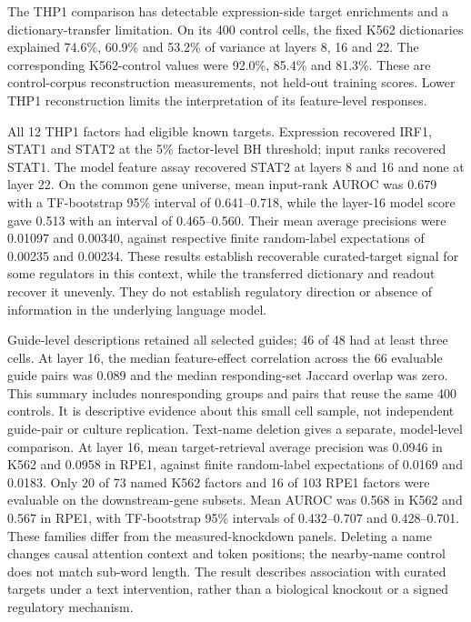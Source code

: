 \documentclass[review,authoryear,12pt]{elsarticle}
\begin{document}
The THP1 comparison has detectable expression-side target enrichments and a dictionary-transfer
limitation. On its 400 control cells, the fixed K562 dictionaries
explained 74.6\%, 60.9\% and 53.2\% of variance at layers 8, 16 and 22. The corresponding
K562-control values were 92.0\%, 85.4\% and 81.3\%. These are control-corpus reconstruction
measurements, not held-out training scores. Lower THP1 reconstruction limits the interpretation
of its feature-level responses.

All 12 THP1 factors had eligible known targets. Expression recovered IRF1, STAT1 and STAT2 at
the 5\% factor-level BH threshold; input ranks recovered STAT1. The model feature assay recovered STAT2
at layers 8 and 16 and none at layer 22. On the common gene universe, mean input-rank AUROC was
0.679 with a TF-bootstrap 95\% interval of 0.641--0.718, while the layer-16 model score gave
0.513 with an interval of 0.465--0.560. Their mean average precisions were 0.01097 and 0.00340,
against respective finite random-label expectations of 0.00235 and 0.00234. These results establish
recoverable curated-target signal for some regulators in this context, while the transferred
dictionary and readout recover it unevenly. They do not establish regulatory direction or absence
of information in the underlying language model.

Guide-level descriptions retained all selected guides; 46 of 48 had at least three cells.
At layer 16, the median feature-effect correlation across the 66 evaluable guide pairs was 0.089
and the median responding-set Jaccard overlap was zero. This summary includes nonresponding groups
and pairs that reuse the same 400 controls. It is descriptive evidence about this small cell sample,
not independent guide-pair or culture replication.
Text-name deletion gives a separate, model-level comparison. At layer 16, mean target-retrieval
average precision was 0.0946 in K562 and 0.0958 in RPE1, against finite random-label expectations
of 0.0169 and 0.0183. Only 20 of 73 named K562 factors and 16 of 103 RPE1 factors were evaluable
on the downstream-gene subsets. Mean AUROC was 0.568 in K562 and 0.567 in RPE1, with TF-bootstrap 95\% intervals
of 0.432--0.707 and 0.428--0.701. These families differ from the measured-knockdown panels.
Deleting a name changes causal attention context and token positions; the nearby-name control
does not match sub-word length. The result describes association with curated targets under a
text intervention, rather than a biological knockout or a signed regulatory mechanism.
\end{document}
